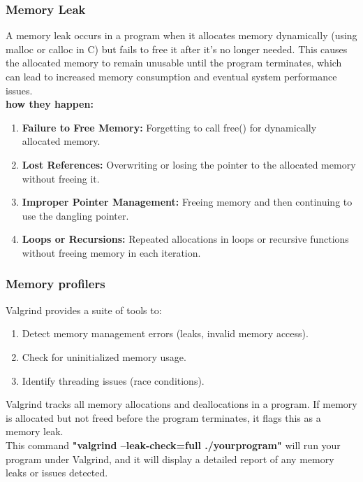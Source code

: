 \documentclass{article}
\begin{document}
        \subsubsection{Memory Leak}
        A memory leak occurs in a program when it allocates memory dynamically (using malloc or calloc in C) but fails to free it after it's no longer needed. This causes the allocated memory to remain unusable until the program terminates, which can lead to increased memory consumption and eventual system performance issues.
        \\\textbf{how they happen:}
        \begin{enumerate}
            \item \textbf{Failure to Free Memory:} Forgetting to call free() for dynamically allocated memory.
            \item \textbf{Lost References:} Overwriting or losing the pointer to the allocated memory without freeing it.
            \item \textbf{Improper Pointer Management:} Freeing memory and then continuing to use the dangling pointer.
            \item \textbf{Loops or Recursions:} Repeated allocations in loops or recursive functions without freeing memory in each iteration.
        \end{enumerate}
        \subsubsection{Memory profilers}
        Valgrind provides a suite of tools to:
        \begin{enumerate}
            \item Detect memory management errors (leaks, invalid memory access).
            \item Check for uninitialized memory usage.
            \item Identify threading issues (race conditions).
        \end{enumerate}
        Valgrind tracks all memory allocations and deallocations in a program. If memory is allocated but not freed before the program terminates, it flags this as a memory leak.
        \\This command \textbf{"valgrind --leak-check=full ./yourprogram"} will run your program under Valgrind, and it will display a detailed report of any memory leaks or issues detected.
\end{document}
